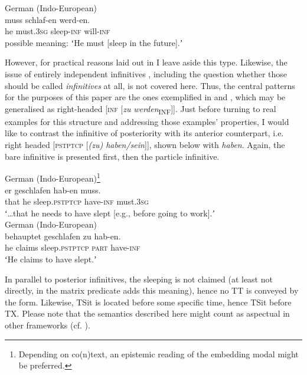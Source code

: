 \documentclass[output=paper,hidelinks]{langscibook}
\begin{document}
\ea\label{ex:reiner:17} German (Indo-European) \\
	{muss}		{schlaf-en}	{werd-en.}\\
     he	must.\textsc{3sg}	sleep-\textsc{inf}	will-\textsc{inf}\\
\glt    possible meaning: ʻHe must [sleep in the future].ʼ\\
\z 

However, for practical reasons laid out in \citet{Reiner2018} I leave aside this type. Likewise, the issue of entirely independent infinitives \citep{Fries1983}, including the question whether those should be called \emph{infinitives} at all, is not covered here.
Thus, the central patterns for the purposes of this paper are the ones exemplified in  and , which may be generalised as right-headed [\textsc{inf} [\emph{zu} \textit{werden}\textsubscript{INF}]]. Just before turning to real examples for this structure and addressing those examples’ properties, I would like to contrast the infinitive of posteriority with its anterior counterpart, i.e. right headed [\textsc{pstptcp} [\emph{(zu) haben/sein}]], shown below with \emph{haben}. Again, the bare infinitive is presented first, then the particle infinitive.\largerpage[1]

\ea\label{ex:reiner:18} German (Indo-European)\footnote{Depending on co(n)text, an epistemic reading of the embedding modal might be preferred.}\\
	{er}	{geschlafen}		{hab-en}	{muss.}\\
 that	he	sleep.\textsc{pstptcp}	have-\textsc{inf}	must.\textsc{3sg}\\
\glt    ʻ\dots that he needs to have slept [e.g., before going to work].ʼ\\
\ex\label{ex:reiner:19} German (Indo-European) \\
	{behauptet}	{geschlafen}		{zu}	{hab-en.}\\
    he	claims		sleep.\textsc{pstptcp}	\textsc{part}	have-\textsc{inf}\\
\glt ʻHe claims to have slept.ʼ\\
\z 

In parallel to posterior infinitives, the sleeping is not claimed (at least not directly, in  the matrix predicate adds this meaning), hence no TT is conveyed by the form. Likewise, TSit is located before some specific time, hence TSit before TX. Please note that the semantics described here might count as aspectual in other frameworks (cf. \citealt[116–117]{Abraham2004}).
\end{document}
